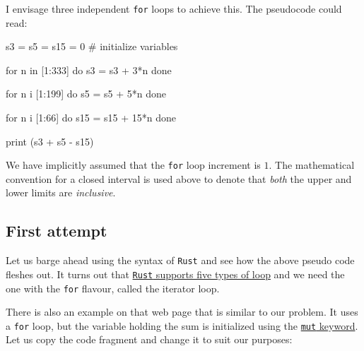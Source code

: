\documentclass[
  a4paper,
]{article}
\newenvironment{Shaded}{\begin{snugshade}}{\end{snugshade}}
\newcommand{\NormalTok}[1]{\textcolor[rgb]{0.80,0.80,0.80}{#1}}
\begin{document}
I envisage three independent \texttt{for} loops to achieve this. The
pseudocode could read:

\begin{Shaded}
\begin{Highlighting}[]
\NormalTok{s3 = s5 = s15 = 0 \# initialize variables}

\NormalTok{for n in [1:333]}
\NormalTok{do}
\NormalTok{  s3 = s3 + 3*n}
\NormalTok{done}

\NormalTok{for n i [1:199]}
\NormalTok{do}
\NormalTok{  s5 = s5 + 5*n}
\NormalTok{done}

\NormalTok{for n i [1:66]}
\NormalTok{do}
\NormalTok{  s15 = s15 + 15*n}
\NormalTok{done}

\NormalTok{print (s3 + s5 {-} s15)}
\end{Highlighting}
\end{Shaded}

We have implicitly assumed that the \texttt{for} loop increment is
\(1\). The mathematical convention for a closed interval is used above
to denote that \emph{both} the upper and lower limits are
\emph{inclusive}.

\hypertarget{first-attempt}{%
\subsection{First attempt}\label{first-attempt}}

Let us barge ahead using the syntax of \texttt{Rust} and see how the
above pseudo code fleshes out. It turns out that
\href{https://doc.rust-lang.org/reference/expressions/loop-expr.html}{\texttt{Rust}
supports five types of loop} and we need the one with the \texttt{for}
flavour, called the iterator loop.

There is also an example on that web page that is similar to our
problem. It uses a \texttt{for} loop, but the variable holding the sum
is initialized using the
\href{https://doc.rust-lang.org/std/keyword.mut.html}{\texttt{mut}
keyword}. Let us copy the code fragment and change it to suit our
purposes:
\end{document}
